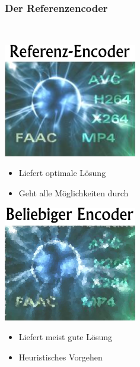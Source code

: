 \documentclass[t]{beamer}
\begin{document}
\begin{frame}
	\frametitle{Der Referenzencoder}
	~\\
	\begin{minipage}{5.3cm}
		\includegraphics[scale=.5]{ref.png}
		~\\
		\begin{itemize}
			\item<2-> Liefert optimale Lösung
			\item<4-> Geht alle Möglichkeiten durch
		\end{itemize}
	\end{minipage}
	\hfill	
	\begin{minipage}{4.7cm}
		\includegraphics[scale=.5]{beliebig.png}
		~\\
		\begin{itemize}
			\item<3-> Liefert meist gute Lösung
			\item<6-> Heuristisches Vorgehen			
		\end{itemize}
	\end{minipage}
\end{frame}
\end{document}

